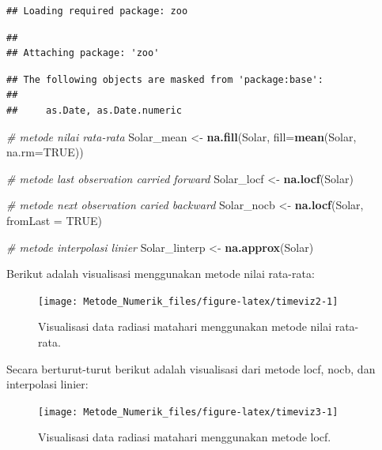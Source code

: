 \documentclass[
]{book}
\newenvironment{Shaded}{\begin{snugshade}}{\end{snugshade}}
\newcommand{\AttributeTok}[1]{\textcolor[rgb]{0.13,0.29,0.53}{#1}}
\newcommand{\CommentTok}[1]{\textcolor[rgb]{0.56,0.35,0.01}{\textit{#1}}}
\newcommand{\ConstantTok}[1]{\textcolor[rgb]{0.56,0.35,0.01}{#1}}
\newcommand{\FunctionTok}[1]{\textcolor[rgb]{0.13,0.29,0.53}{\textbf{#1}}}
\newcommand{\NormalTok}[1]{#1}
\newcommand{\OtherTok}[1]{\textcolor[rgb]{0.56,0.35,0.01}{#1}}
\theoremstyle{definition}
\theoremstyle{definition}
\theoremstyle{definition}
\theoremstyle{definition}
\theoremstyle{remark}
\begin{document}
\begin{verbatim}
## Loading required package: zoo
\end{verbatim}

\begin{verbatim}
## 
## Attaching package: 'zoo'
\end{verbatim}

\begin{verbatim}
## The following objects are masked from 'package:base':
## 
##     as.Date, as.Date.numeric
\end{verbatim}

\begin{Shaded}
\begin{Highlighting}[]
\CommentTok{\# metode nilai rata{-}rata}
\NormalTok{Solar\_mean }\OtherTok{\textless{}{-}} \FunctionTok{na.fill}\NormalTok{(Solar, }\AttributeTok{fill=}\FunctionTok{mean}\NormalTok{(Solar, }\AttributeTok{na.rm=}\ConstantTok{TRUE}\NormalTok{))}

\CommentTok{\# metode last observation carried forward}
\NormalTok{Solar\_locf }\OtherTok{\textless{}{-}} \FunctionTok{na.locf}\NormalTok{(Solar)}

\CommentTok{\# metode next observation caried backward}
\NormalTok{Solar\_nocb }\OtherTok{\textless{}{-}} \FunctionTok{na.locf}\NormalTok{(Solar, }\AttributeTok{fromLast =} \ConstantTok{TRUE}\NormalTok{)}

\CommentTok{\# metode interpolasi linier}
\NormalTok{Solar\_linterp }\OtherTok{\textless{}{-}} \FunctionTok{na.approx}\NormalTok{(Solar)}
\end{Highlighting}
\end{Shaded}

Berikut adalah visualisasi menggunakan metode nilai rata-rata:

\begin{figure}

{\centering \texttt{[image: Metode\_Numerik\_files/figure-latex/timeviz2-1]} 

}

\caption{Visualisasi data radiasi matahari menggunakan metode nilai rata-rata.}\label{fig:timeviz2}
\end{figure}

Secara berturut-turut berikut adalah visualisasi dari metode locf, nocb, dan interpolasi linier:

\begin{figure}

{\centering \texttt{[image: Metode\_Numerik\_files/figure-latex/timeviz3-1]} 

}

\caption{Visualisasi data radiasi matahari menggunakan metode locf.}\label{fig:timeviz3}
\end{figure}
\end{document}

